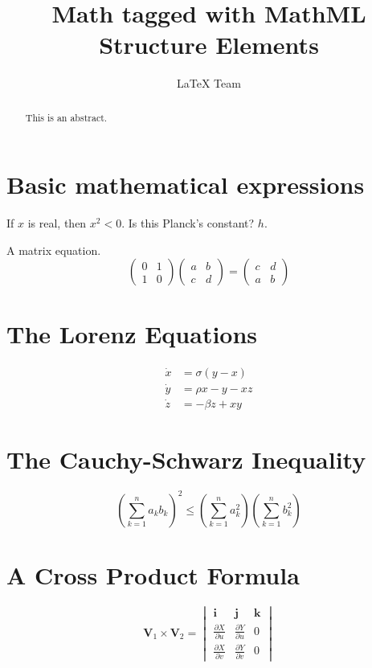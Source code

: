\documentclass{ximera}
\title{Math tagged with MathML Structure Elements}
\author{LaTeX Team}
\begin{document}
\begin{abstract}
    This is an abstract.
\end{abstract}
\maketitle

\section{Basic mathematical expressions}

If $x$ is real, then $x^{2} < 0$. Is this Planck's constant? $h$.

A matrix equation.
\[
\begin{pmatrix}0&1\\1&0\end{pmatrix}
\begin{pmatrix}a&b\\c&d\end{pmatrix}
=
\begin{pmatrix}c&d\\a&b\end{pmatrix}
\]

\section{The Lorenz Equations}
\[\begin{aligned}
\dot{x} & = \sigma(y-x) \\
\dot{y} & = \rho x - y - xz \\
\dot{z} & = -\beta z + xy
\end{aligned} \]

\section{The Cauchy-Schwarz Inequality}
\[ \left( \sum_{k=1}^n a_k b_k \right)^2 \leq \left( \sum_{k=1}^n a_k^2 \right) \left( \sum_{k=1}^n b_k^2 \right) \]
\section{A Cross Product Formula}
\[\mathbf{V}_1 \times \mathbf{V}_2 =  \begin{vmatrix}
\mathbf{i} & \mathbf{j} & \mathbf{k} \\
\frac{\partial X}{\partial u} &  \frac{\partial Y}{\partial u} & 0 \\
\frac{\partial X}{\partial v} &  \frac{\partial Y}{\partial v} & 0
\end{vmatrix}  \]
\end{document}
